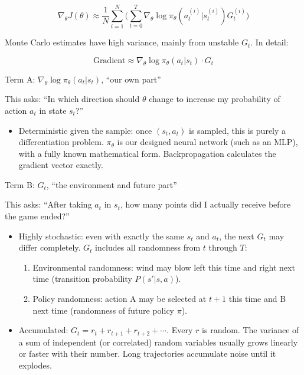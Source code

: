 \[
\nabla_\theta J(\theta)
\approx
\frac{1}{N}\sum_{i=1}^{N}
\bigl(
\sum_{t=0}^{T}
\nabla_\theta\log\pi_\theta(a_t^{(i)}|s_t^{(i)})G_t^{(i)}
\bigr)
\]

Monte Carlo estimates have high variance, mainly from unstable \(G_t\). In detail:

\[
\text{Gradient}\approx\nabla_\theta\log\pi_\theta(a_t|s_t)\cdot G_t
\]

Term A: \(\nabla_\theta\log\pi_\theta(a_t|s_t)\), ``our own part''

This asks: ``In which direction should \(\theta\) change to increase my probability of action \(a_t\) in state \(s_t\)?''

\begin{itemize}
\tightlist
\item
  Deterministic given the sample: once \((s_t,a_t)\) is sampled, this is purely a differentiation problem. \(\pi_\theta\) is our designed neural network (such as an MLP), with a fully known mathematical form. Backpropagation calculates the gradient vector exactly.
\end{itemize}

Term B: \(G_t\), ``the environment and future part''

This asks: ``After taking \(a_t\) in \(s_t\), how many points did I actually receive before the game ended?''

\begin{itemize}
\tightlist
\item
{}
  Highly stochastic: even with exactly the same \(s_t\) and \(a_t\), the next \(G_t\) may differ completely. \(G_t\) includes all randomness from \(t\) through \(T\):

  \begin{enumerate}
  \def\labelenumi{\arabic{enumi}.}
  \tightlist
  \item
    Environmental randomness: wind may blow left this time and right next time (transition probability \(P(s'|s,a)\)).
  \item
    Policy randomness: action A may be selected at \(t+1\) this time and B next time (randomness of future policy \(\pi\)).
  \end{enumerate}
\item
  Accumulated: \(G_t=r_t+r_{t+1}+r_{t+2}+\cdots\). Every \(r\) is random. The variance of a sum of independent (or correlated) random variables usually grows linearly or faster with their number. Long trajectories accumulate noise until it explodes.
\end{itemize}

